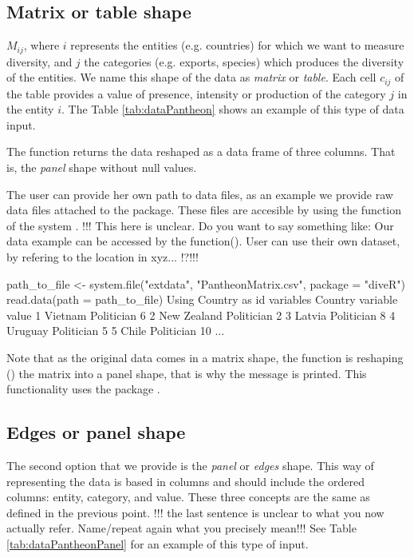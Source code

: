 \subsection{Matrix or table shape}
 $M_{ij}$, where $i$ represents the entities (e.g. countries) for which we want to measure diversity, and $j$ the categories (e.g. exports, species) which produces the diversity of the entities. We name this shape of the data as \emph{matrix} or \emph{table}. Each cell $c_{ij}$ of the table provides a value of presence, intensity or production of the category $j$ in the entity $i$. The Table \ref{tab:dataPantheon} shows an example of this type of data input. 
  
  
  
  The function returns the data reshaped as a data frame of three columns. That is, the \emph{panel} shape without null values.
  
  The user can provide her own path to data files, as an example we provide raw data files attached to the package. These files are accesible by using the function of the system .   !!! This here is unclear. Do you want to say something like: Our data example can be accessed by the function(). User can use their own dataset, by refering to the location in xyz... !?!!!
  
  \begin{example}
 path_to_file <- system.file("extdata", "PantheonMatrix.csv", package = "diveR")
 read.data(path = path_to_file)
 Using Country as id variables
         Country            variable value
1        Vietnam          Politician     6
2    New Zealand          Politician     2
3         Latvia          Politician     8
4        Uruguay          Politician     5
5          Chile          Politician    10
...
\end{example}

Note that as the original data comes in a matrix shape, the function  is reshaping () the matrix into a panel shape, that is why the message  is printed. This functionality uses the package .


  \subsection{Edges or panel shape}
  The second option that we provide is the \emph{panel} or \emph{edges} shape. This way of representing the data is based in columns and should include the ordered columns: entity, category, and value. These three concepts are the same as defined in the previous point. !!! the last sentence is unclear to what you now actually refer. Name/repeat again what you precisely mean!!! See Table \ref{tab:dataPantheonPanel} for an example of this type of input.

